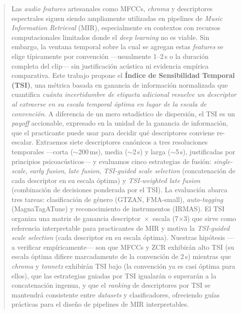 \documentclass[conference]{IEEEtran}
\begin{document}
\begin{abstract}
Las \textit{audio features} artesanales como MFCCs, \textit{chroma} y descriptores espectrales siguen siendo ampliamente utilizadas en pipelines de \textit{Music Information Retrieval} (MIR), especialmente en contextos con recursos computacionales limitados donde el \textit{deep learning} no es viable. Sin embargo, la ventana temporal sobre la cual se agregan estas \textit{features} se elige típicamente por convención ---usualmente 1--2\,s o la duración completa del clip--- sin justificación acústica ni evidencia empírica comparativa. Este trabajo propone el \textbf{Índice de Sensibilidad Temporal (TSI)}, una métrica basada en ganancia de información normalizada que cuantifica \emph{cuánta incertidumbre de etiqueta adicional resuelve un descriptor al extraerse en su escala temporal óptima en lugar de la escala de convención}. A diferencia de un mero estadístico de dispersión, el TSI es un \emph{payoff} accionable, expresado en la unidad de la ganancia de información, que el practicante puede usar para decidir qué descriptores conviene re-escalar. Extraemos siete descriptores canónicos a tres resoluciones temporales ---corta ($\sim$200\,ms), media ($\sim$2\,s) y larga ($\sim$5\,s), justificadas por principios psicoacústicos--- y evaluamos cinco estrategias de fusión: \textit{single-scale}, \textit{early fusion}, \textit{late fusion}, \textit{TSI-guided scale selection} (concatenación de cada descriptor en su escala óptima) y \textit{TSI-weighted late fusion} (combinación de decisiones ponderada por el TSI). La evaluación abarca tres tareas: clasificación de género (GTZAN, FMA-small), \textit{auto-tagging} (MagnaTagATune) y reconocimiento de instrumentos (IRMAS). El TSI organiza una matriz de ganancia descriptor~$\times$~escala (7$\times$3) que sirve como referencia interpretable para practicantes de MIR y motiva la \textit{TSI-guided scale selection} (cada descriptor en su escala óptima). Nuestras hipótesis ---a verificar empíricamente--- son que MFCCs y ZCR exhibirán alto TSI (su escala óptima difiere marcadamente de la convención de 2\,s) mientras que \textit{chroma} y \textit{tonnetz} exhibirán TSI bajo (la convención ya es casi óptima para ellos), que las estrategias guiadas por TSI igualarán o superarán a la concatenación ingenua, y que el \emph{ranking} de descriptores por TSI se mantendrá consistente entre \textit{datasets} y clasificadores, ofreciendo guías prácticas para el diseño de pipelines de MIR interpretables.
\end{abstract}
\end{document}
